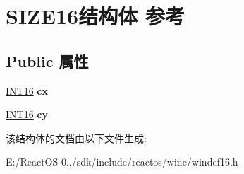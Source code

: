 \hypertarget{struct_s_i_z_e16}{}\section{S\+I\+Z\+E16结构体 参考}
\label{struct_s_i_z_e16}
\subsection*{Public 属性}
\begin{DoxyCompactItemize}
\item 
\mbox{\label{struct_s_i_z_e16_a48a8d24741d25ba175b48300864b5844}} 
\hyperlink{_processor_bind_8h_a30f500129d8c688af07726d5d34ce52d}{I\+N\+T16} {\bfseries cx}
\item 
\mbox{\label{struct_s_i_z_e16_a3b45c706ebd4c46811491e02833c5be8}} 
\hyperlink{_processor_bind_8h_a30f500129d8c688af07726d5d34ce52d}{I\+N\+T16} {\bfseries cy}
\end{DoxyCompactItemize}


该结构体的文档由以下文件生成\+:\begin{DoxyCompactItemize}
\item 
E\+:/\+React\+O\+S-\/0../sdk/include/reactos/wine/windef16.\+h\end{DoxyCompactItemize}
